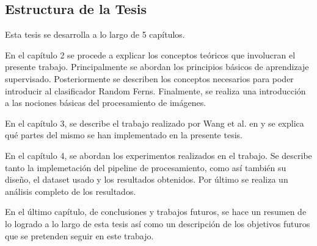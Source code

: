 \subsection{Estructura de la Tesis}

	Esta tesis se desarrolla a lo largo de 5 capítulos.	
		
	En el capítulo 2 se procede a explicar los conceptos teóricos que involucran el presente trabajo. Principalmente se abordan los principios básicos de aprendizaje supervisado. Posteriormente se describen los conceptos necesarios para poder introducir  al clasificador Random Ferns. Finalmente, se realiza una introducción a las nociones básicas del procesamiento de imágenes.
	
	 En el capítulo 3, se describe el trabajo realizado por Wang et al. en \cite{wang} y se explica qué partes del mismo se han implementado en la presente tesis.

	En el capítulo 4, se abordan los experimentos realizados en el trabajo. Se describe tanto la implemetación del pipeline de procesamiento, como así también su diseño, el dataset usado y los resultados obtenidos. Por último se realiza un análisis completo de los resultados.
	
	En el último capítulo, de conclusiones y trabajos futuros, se hace un resumen de lo logrado a lo largo de esta tesis así como un descripción de los objetivos futuros que se pretenden seguir en este trabajo.
